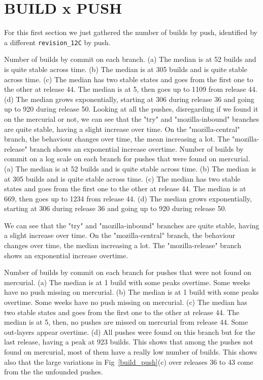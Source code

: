 \section{BUILD x PUSH}
\label{build_push_sec}

For this first section we just gathered the number of builds by push, identified by a different \texttt{revision\_12C} by push. 

{
    Number of builds by commit on each branch. (a) The median is at 52 builds and is quite stable across time. (b) The median is at 305 builds and is quite stable across time.  (c) The median has two stable states and goes from the first one to the other at release 44. The median is at 5, then goes up to 1109 from release 44. (d) The median grows exponentially, starting at 306 during release 36 and going up to 920 during release 50.
}
{
    Looking at all the pushes, disregarding if we found it on the mercurial or not, we can see that the "try" and "mozilla-inbound" branches are quite stable, having a slight increase over time. On the "mozilla-central" branch, the behaviour changes over time, the mean increasing a lot. The "mozilla-release" branch shows an exponential increase overtime.
}
{  
    Number of builds by commit on a log scale on each branch for pushes that were found on mercurial. (a) The median is at 52 builds and is quite stable across time. (b) The median is at 305 builds and is quite stable across time.  (c) The median has two stable states and goes from the first one to the other at release 44. The median is at 669, then goes up to 1234 from release 44. (d) The median grows exponentially, starting at 306 during release 36 and going up to 920 during release 50.
}
{
    We can see that the "try" and "mozilla-inbound" branches are quite stable, having a slight increase over time. On the "mozilla-central" branch, the behaviour changes over time, the median increasing a lot. The "mozilla-release" branch shows an exponential increase overtime.
    
    
}
{
    Number of builds by commit on each branch for pushes that were not found on mercurial. (a) The median is at 1 build with some peaks overtime. Some weeks have no push missing on mercurial. (b) The median is at 1 build with some peaks overtime. Some weeks have no push missing on mercurial. (c) The median has two stable states and goes from the first one to the other at release 44. The median is at 5, then, no pushes are missed on mercurial from release 44. Some out-layers appear overtime. (d) All pushes were found on this branch but for the last release, having a peak at 923 builds.
}
{
    This shows that among the pushes not found on mercurial, most of them have a really low number of builds. This shows also that the large variations in Fig~\ref{build_push}(c) over releases 36 to 43 come from the the unfounded pushes.
}
